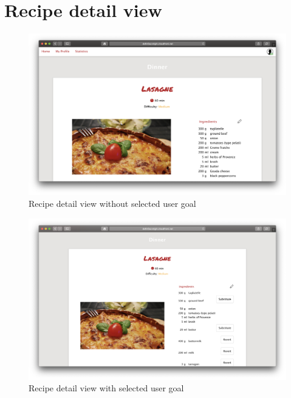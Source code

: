 \section*{Recipe detail view}
\vspace{-2em}
\begin{figure}[H]
	\captionsetup{justification=centering}
	\begin{center}
		\includegraphics[scale=0.25]{Ressourcen/img/screenshots/screenshotH.png}
		\vspace{-3em}
		\caption{Recipe detail view without selected user goal}
	\end{center}
\end{figure}
\vspace{-2em}
\begin{figure}[H]
	\captionsetup{justification=centering}
	\begin{center}
		\includegraphics[scale=0.25]{Ressourcen/img/screenshots/screenshotI.png}
		\vspace{-3em}
		\caption{Recipe detail view with selected user goal}
	\end{center}
\end{figure}
